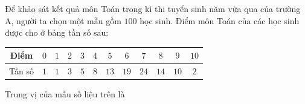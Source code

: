\begin{ex}
Để khảo sát kết quả môn Toán trong kì thi tuyển sinh năm vừa qua của trường A, người ta chọn một mẫu gồm $100$ học sinh. Điểm môn Toán của các học sinh được cho ở bảng tần số sau:
\begin{center}
\begin{tabular}{|c|c|c|c|c|c|c|c|c|c|c|c|}\hline
Điểm & $0$ & $1$ & $2$ & $3$ & $4$ & $5$ & $6$ & $7$ & $8$ & $9$ & $10$\\\hline
Tần số & $1$ & $1$ & $3$ & $5$ & $8$ & $13$ & $19$ & $24$ & $14$ & $10$ & $2$\\\hline
\end{tabular}
\end{center}
Trung vị của mẫu số liệu trên là
\end{ex}
